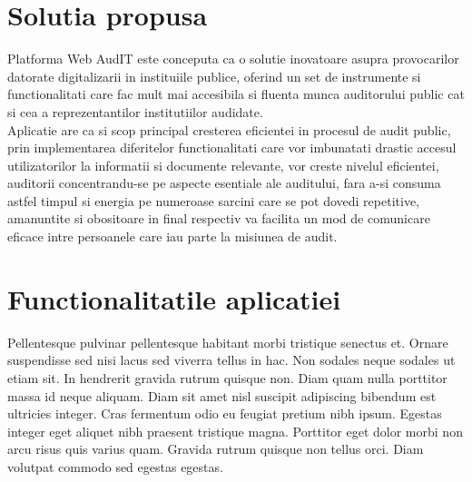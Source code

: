 \section{Solutia propusa}
Platforma Web AudIT este conceputa ca o solutie inovatoare asupra provocarilor datorate digitalizarii in instituiile publice, oferind un set de instrumente si functionalitati care fac mult mai accesibila si fluenta munca auditorului public cat si cea a reprezentantilor institutiilor audidate.\\
Aplicatie are ca si scop principal cresterea eficientei in procesul de audit public, prin implementarea diferitelor functionalitati care vor imbunatati drastic accesul utilizatorilor la informatii si documente relevante, vor creste nivelul eficientei, auditorii concentrandu-se pe aspecte esentiale ale auditului, fara a-si consuma  astfel timpul si energia pe numeroase sarcini care se pot dovedi repetitive, amanuntite si obositoare in final	respectiv va facilita un mod de comunicare eficace intre persoanele care iau parte la misiunea de audit.\\



\section{Functionalitatile aplicatiei}

Pellentesque pulvinar pellentesque habitant morbi tristique senectus et. Ornare suspendisse sed nisi lacus sed viverra tellus in hac. Non sodales neque sodales ut etiam sit. In hendrerit gravida rutrum quisque non. Diam quam nulla porttitor massa id neque aliquam. Diam sit amet nisl suscipit adipiscing bibendum est ultricies integer. Cras fermentum odio eu feugiat pretium nibh ipsum. Egestas integer eget aliquet nibh praesent tristique magna. Porttitor eget dolor morbi non arcu risus quis varius quam. Gravida rutrum quisque non tellus orci. Diam volutpat commodo sed egestas egestas.